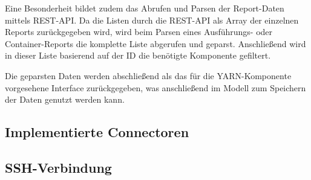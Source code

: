 Eine Besonderheit bildet zudem das Abrufen und Parsen der Report-Daten mittels REST-API. Da die Listen durch die REST-API als Array der einzelnen Reports zurückgegeben wird, wird beim Parsen eines Ausführungs- oder Container-Reports die komplette Liste abgerufen und geparst. Anschließend wird in dieser Liste basierend auf der ID die benötigte Komponente gefiltert.

Die geparsten Daten werden abschließend als das für die YARN-Komponente vorgesehene Interface zurückgegeben, was anschließend im Modell zum Speichern der Daten genutzt werden kann.

\subsection{Implementierte Connectoren}\label{sec:implementedConnectors}

\subsection{SSH-Verbindung}\label{sec:sshConnection}

